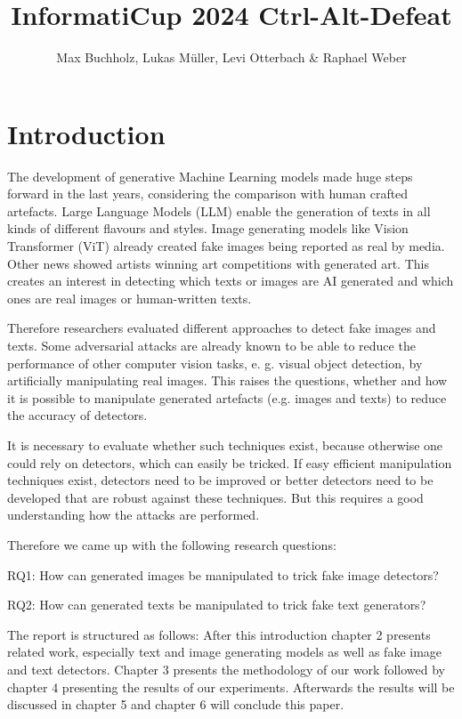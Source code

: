 \documentclass{article} %
\title{InformatiCup 2024 Ctrl-Alt-Defeat}
\author{Max Buchholz, Lukas Müller, Levi Otterbach \& Raphael Weber}
\begin{document}
\maketitle

\begin{abstract}

\end{abstract}

\section{Introduction}
The development of generative Machine Learning models made huge steps forward in the last years, considering the comparison with human crafted artefacts. Large Language Models (LLM) enable the generation of texts in all kinds of different flavours and styles. Image generating models like Vision Transformer (ViT) already created fake images being reported as real by media. Other news showed artists winning art competitions with generated art. This creates an interest in detecting which texts or images are AI generated and which ones are real images or human-written texts.

Therefore researchers evaluated different approaches to detect fake images and texts. Some adversarial attacks are already known to be able to reduce the performance of other computer vision tasks, e. g. visual object detection, by artificially manipulating real images. This raises the questions, whether and how it is possible to manipulate generated artefacts (e.g. images and texts) to reduce the accuracy of detectors.


It is necessary to evaluate whether such techniques exist, because otherwise one could rely on detectors, which can easily be tricked. If easy efficient manipulation techniques exist, detectors need to be improved or better detectors need to be developed that are robust against these techniques. But this requires a good understanding how the attacks are performed.

Therefore we came up with the following research questions:


RQ1: How can generated images be manipulated to trick fake image detectors?


RQ2: How can generated texts be manipulated to trick fake text generators?


The report is structured as follows: After this introduction chapter 2 presents related work, especially text and image generating models as well as fake image and text detectors. Chapter 3 presents the methodology of our work followed by chapter 4 presenting the results of our experiments. Afterwards the results will be discussed in chapter 5 and chapter 6 will conclude this paper.
\end{document}
